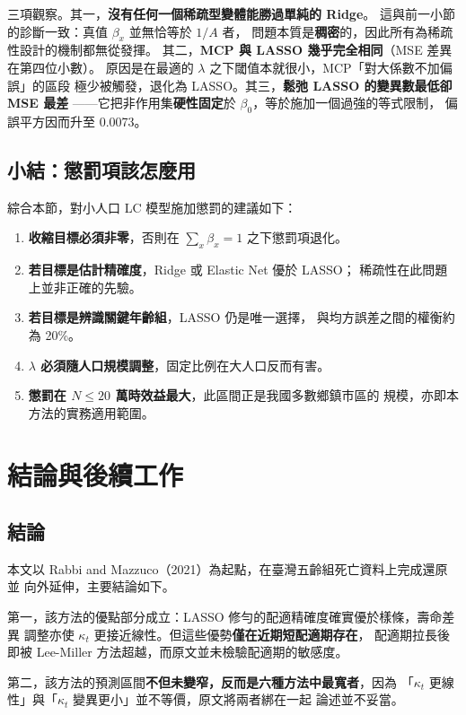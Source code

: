 \documentclass[UTF8, fontset=macnew, a4paper, 12pt]{ctexart}
\begin{document}
三項觀察。其一，\textbf{沒有任何一個稀疏型變體能勝過單純的 Ridge}。
這與前一小節的診斷一致：真值 $\beta_x$ 並無恰等於 $1/A$ 者，
問題本質是\textbf{稠密}的，因此所有為稀疏性設計的機制都無從發揮。
其二，\textbf{MCP 與 LASSO 幾乎完全相同}（MSE 差異在第四位小數）。
原因是在最適的 $\lambda$ 之下閾值本就很小，MCP「對大係數不加偏誤」的區段
極少被觸發，退化為 LASSO。其三，\textbf{鬆弛 LASSO 的變異數最低卻 MSE 最差}
——它把非作用集\textbf{硬性固定}於 $\beta_0$，等於施加一個過強的等式限制，
偏誤平方因而升至 0.0073。

\subsection{小結：懲罰項該怎麼用}

綜合本節，對小人口 LC 模型施加懲罰的建議如下：

\begin{enumerate}[leftmargin=*]
  \item \textbf{收縮目標必須非零}，否則在 $\sum_x\beta_x=1$ 之下懲罰項退化。
  \item \textbf{若目標是估計精確度}，Ridge 或 Elastic Net 優於 LASSO；
        稀疏性在此問題上並非正確的先驗。
  \item \textbf{若目標是辨識關鍵年齡組}，LASSO 仍是唯一選擇，
        與均方誤差之間的權衡約為 20\%。
  \item \textbf{$\lambda$ 必須隨人口規模調整}，固定比例在大人口反而有害。
  \item \textbf{懲罰在 $N\le20$ 萬時效益最大}，此區間正是我國多數鄉鎮市區的
        規模，亦即本方法的實務適用範圍。
\end{enumerate}

\section{結論與後續工作}

\subsection{結論}

本文以 Rabbi and Mazzuco（2021）為起點，在臺灣五齡組死亡資料上完成還原並
向外延伸，主要結論如下。

第一，該方法的優點部分成立：LASSO 修勻的配適精確度確實優於樣條，壽命差異
調整亦使 $\kappa_t$ 更接近線性。但這些優勢\textbf{僅在近期短配適期存在}，
配適期拉長後即被 Lee-Miller 方法超越，而原文並未檢驗配適期的敏感度。

第二，該方法的預測區間\textbf{不但未變窄，反而是六種方法中最寬者}，因為
「$\kappa_t$ 更線性」與「$\kappa_t$ 變異更小」並不等價，原文將兩者綁在一起
論述並不妥當。
\end{document}
